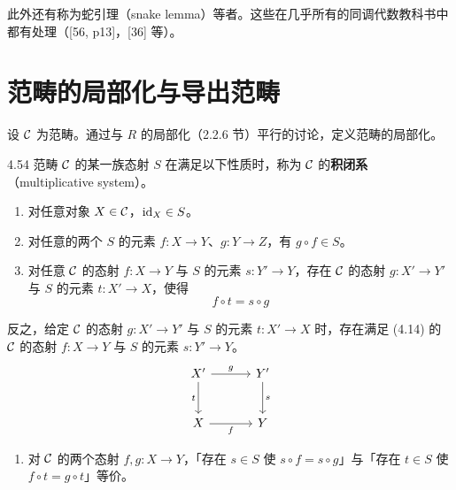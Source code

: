 此外还有称为蛇引理（snake lemma）等者。这些在几乎所有的同调代数教科书中都有处理（[56, p13]，[36] 等）。

\section{范畴的局部化与导出范畴}

设 $\mathcal{C}$ 为范畴。通过与 $R$ 的局部化（2.2.6 节）平行的讨论，定义范畴的局部化。

\begin{definition}{4.54}
范畴 $\mathcal{C}$ 的某一族态射 $S$ 在满足以下性质时，称为 $\mathcal{C}$ 的\textbf{积闭系}（multiplicative system）。
\begin{enumerate}[label=(S\arabic*)]
  \item 对任意对象 $X\in\mathcal{C}$，$\mathrm{id}_X\in S$。
  \item 对任意的两个 $S$ 的元素 $f\colon X\to Y$、$g\colon Y\to Z$，有 $g\circ f\in S$。
  \item 对任意 $\mathcal{C}$ 的态射 $f\colon X\to Y$ 与 $S$ 的元素 $s\colon Y'\to Y$，存在 $\mathcal{C}$ 的态射 $g\colon X'\to Y'$ 与 $S$ 的元素 $t\colon X'\to X$，使得
        \begin{equation}
          f\circ t=s\circ g \tag{4.14}
        \end{equation}
\end{enumerate}
反之，给定 $\mathcal{C}$ 的态射 $g\colon X'\to Y'$ 与 $S$ 的元素 $t\colon X'\to X$ 时，存在满足 (4.14) 的 $\mathcal{C}$ 的态射 $f\colon X\to Y$ 与 $S$ 的元素 $s\colon Y'\to Y$。
\[\begin{tikzcd}[row sep=2.6em, column sep=3.2em]
  X' \arrow[r,"g"] \arrow[d,"t"'] & Y' \arrow[d,"s"] \\
  X \arrow[r,"f"'] & Y
\end{tikzcd}\]
\begin{enumerate}[label=(S\arabic*), start=4]
  \item 对 $\mathcal{C}$ 的两个态射 $f,g\colon X\to Y$，「存在 $s\in S$ 使 $s\circ f=s\circ g$」与「存在 $t\in S$ 使 $f\circ t=g\circ t$」等价。
\end{enumerate}
\end{definition}

